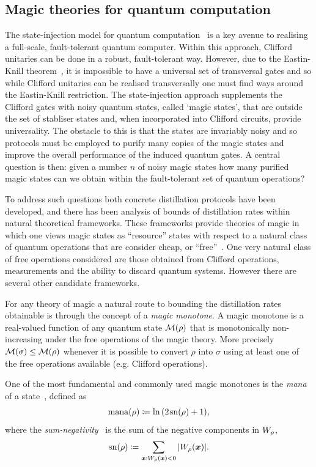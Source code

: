 \documentclass[pra,
aps,
twocolumn,
superscriptaddress,
groupedaddress,
nofootinbib,
reprint
]{revtex4-1}
\begin{document}
\subsection{Magic theories for quantum computation}
\label{sec:mono}

The state-injection model for quantum computation~\cite{cit:bravyi} is a key avenue to realising a full-scale, fault-tolerant quantum computer. Within this approach, Clifford unitaries can be done in a robust, fault-tolerant way. However, due to the Eastin-Knill theorem~\cite{Eastin_2009}, it is impossible to have a universal set of transversal gates and so while Clifford unitaries can be realised transversally one must find ways around the Eastin-Knill restriction. The state-injection approach supplements the Clifford gates with noisy quantum states, called `magic states', that are outside the set of stabliser states and, when incorporated into Clifford circuits, provide universality. The obstacle to this is that the states are invariably noisy and so protocols must be employed to purify many copies of the magic states and improve the overall performance of the induced quantum gates. A central question is then: given a number $n$ of noisy magic states how many purified magic states can we obtain within the fault-tolerant set of quantum operations?

To address such questions both concrete distillation protocols have been developed, and there has been analysis of bounds of distillation rates within natural theoretical frameworks. These frameworks provide theories of magic in which one views magic states as ``resource'' states with respect to a natural class of quantum operations that are consider cheap, or ``free''~\cite{Gour_2019}. One very natural class of free operations considered are those obtained from Clifford operations, measurements and the ability to discard quantum systems. However there are several other candidate frameworks. 

For any theory of magic a natural route to bounding the distillation rates obtainable is through the concept of a \emph{magic monotone}. A magic monotone is a real-valued function of any quantum state $\mathcal{M}(\rho)$ that is monotonically non-increasing under the free operations of the magic theory. More precisely $\mathcal{M}(\sigma) \le \mathcal{M}(\rho)$ whenever it is possible to convert $\rho$ into $\sigma$ using at least one of the free operations available (e.g. Clifford operations).

One of the most fundamental and commonly used magic monotones is the \emph{mana} of a state~\cite{cit:veitch2}, defined as
\begin{equation}
    {{\rm{mana}}(\rho)} \coloneqq \ln{(2\hspace{1pt} {{\rm{sn}}(\rho)} +1)},
\end{equation}
where the \emph{sum-negativity}~\cite{cit:veitch2} is the sum of the negative components in $\W{\rho}$,
\begin{equation}
    \sn{\rho} \coloneqq \sum\limits_{\bmx: \W[\bmx]{\rho} < 0} \abs{\W[\bmx]{\rho}}.
\end{equation}
\end{document}
